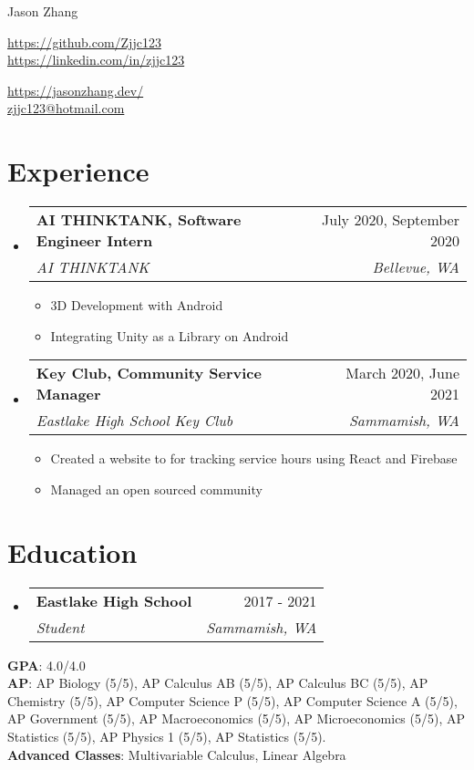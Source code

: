 \documentclass[letterpaper,10pt]{article}
\makeatletter
\newcommand{\resumeItem}[1]{
  \item\small{
    {#1 \vspace{-2pt}}
  }
}
\newcommand{\resumeSubheading}[4]{
  \vspace{-2pt}\item
    \begin{tabular*}{0.97\textwidth}[t]{l@{\extracolsep{\fill}}r}
      \textbf{#1} & #2 \\
      \textit{\small#3} & \textit{\small #4} \\
    \end{tabular*}\vspace{-7pt}
}
\newcommand{\resumeSubHeadingListStart}{\begin{itemize}[leftmargin=0.15in, label={}]}
\newcommand{\resumeSubHeadingListEnd}{\end{itemize}}
\newcommand{\resumeItemListStart}{\begin{itemize}}
\newcommand{\resumeItemListEnd}{\end{itemize}\vspace{-5pt}}
\makeatother
\begin{document}
\begin{center}
    {\large Jason Zhang} \\ \vspace{-2pt}
    \begin{multicols}{2}
    \begin{flushleft}
    \href{{your github page link}}{https://github.com/Zjjc123}\\
    \href{{your linkedin page link}}{https://linkedin.com/in/zjjc123}
    \end{flushleft}

    \begin{flushright}
    \href{{your personal websit link}}{https://jasonzhang.dev/}\\
    \href{mailto:{your email adress}}{zjjc123@hotmail.com}
    \end{flushright}
    \end{multicols}
\end{center}
\vspace{-15pt}
\section{Experience}
  \resumeSubHeadingListStart
    \resumeSubheading
      {AI THINKTANK, Software Engineer Intern}{July 2020, September 2020}
      {AI THINKTANK}{Bellevue, WA}
      \resumeItemListStart
        \resumeItem{3D Development with Android}
        \resumeItem{Integrating Unity as a Library on Android}
    \resumeItemListEnd
  \resumeSubHeadingListEnd
\vspace{-5pt}
  \resumeSubHeadingListStart
    \resumeSubheading
      {Key Club, Community Service Manager}{March 2020, June 2021}
      {Eastlake High School Key Club}{Sammamish, WA}
      \resumeItemListStart
        \resumeItem{Created a website to for tracking service hours using React and Firebase}
        \resumeItem{Managed an open sourced community}
    \resumeItemListEnd
  \resumeSubHeadingListEnd
\vspace{-5pt}
\section{Education}
  \resumeSubHeadingListStart
    \resumeSubheading
      {Eastlake High School}{2017 - 2021}
      {Student}{Sammamish, WA}
  \resumeSubHeadingListEnd

 \begin{itemize}[leftmargin=0.15in, label={}]
    \small{\item{
     \textbf{GPA}{: 4.0/4.0} \\
     \textbf{AP}{: AP Biology (5/5), AP Calculus AB (5/5), AP Calculus BC (5/5), AP Chemistry (5/5), AP Computer Science P (5/5), AP Computer Science A (5/5), AP Government (5/5), AP Macroeconomics (5/5), AP Microeconomics (5/5), AP Statistics (5/5), AP Physics 1 (5/5), AP Statistics (5/5).} \\
     \textbf{Advanced Classes}{: Multivariable Calculus, Linear Algebra}
    }}
 \end{itemize}
 \vspace{-15pt}
\end{document}
